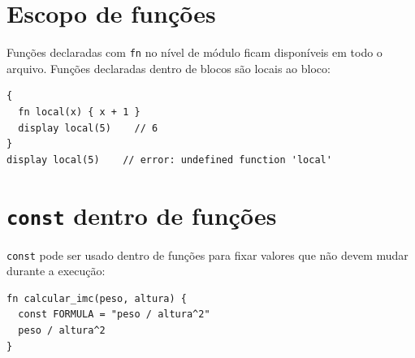 \section{Escopo de funções}

Funções declaradas com \lstinline{fn} no nível de módulo ficam disponíveis em todo
o arquivo. Funções declaradas dentro de blocos são locais ao bloco:

\begin{lstlisting}
{
  fn local(x) { x + 1 }
  display local(5)    // 6
}
display local(5)    // error: undefined function 'local'
\end{lstlisting}

\section{\texttt{const} dentro de funções}

\lstinline{const} pode ser usado dentro de funções para fixar valores que não devem
mudar durante a execução:

\begin{lstlisting}
fn calcular_imc(peso, altura) {
  const FORMULA = "peso / altura^2"
  peso / altura^2
}
\end{lstlisting}
